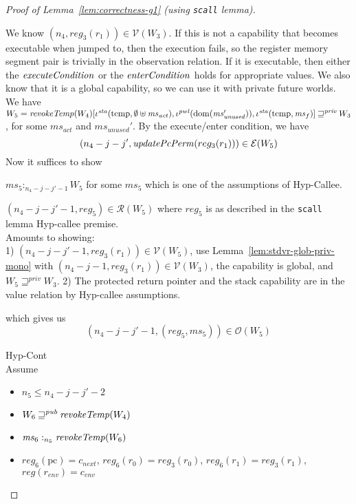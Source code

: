 \documentclass[a4paper]{article}
\DeclareMathOperator{\dom}{dom}
\newcommand\lau[1]{{\color{purple} \sf \footnotesize {LS: #1}}\\}
\renewcommand\lau[1]{}
\newcommand{\var}[1]{\mathit{#1}}
\newcommand{\hs}{\var{ms}}
\newcommand{\ms}{\hs}
\newcommand{\pcreg}{\mathrm{pc}}
\newcommand{\reg}{\var{reg}}
\newcommand{\heap}{\var{mem}}
\newcommand{\pwl}{\var{pwl}}
\newcommand{\sta}{\var{sta}}
\newcommand{\env}{\var{env}}
\newcommand{\unused}{\var{unused}}
\newcommand{\act}{\var{act}}
\newcommand{\plainfun}[2]{
  \ifthenelse{\equal{#2}{}}
  {\mathit{#1}}
  {\mathit{#1}(#2)}
}
\newcommand{\updatePcPerm}[1]{\plainfun{updatePcPerm}{#1}}
\newcommand{\execCond}[1]{\plainfun{executeCondition}{#1}}
\newcommand{\entryCond}[1]{\plainfun{enterCondition}{#1}}
\newcommand{\revokeTemp}[1]{\plainfun{revokeTemp}{#1}}
\newcommand{\futurewk}{\mathbin{\sqsupseteq}^{\var{pub}}}
\newcommand{\futurestr}{\mathbin{\sqsupseteq}^{\var{priv}}}
\newcommand{\heapSat}[3][\heap]{#1 :_{#2} #3}
\newcommand{\memSat}[3][n]{\heapSat[#2]{#1}{#3}}
\newcommand{\asmType}{\plaindom{AsmType}}
\newcommand{\plaindom}[1]{\mathrm{#1}}
\newcommand{\intr}[2]{\mathcal{#1}}
\newcommand{\valueintr}[1]{\intr{V}{#1}}
\newcommand{\exprintr}[1]{\intr{E}{#1}}
\newcommand{\regintr}[1]{\intr{R}{#1}}
\newcommand{\stdvr}{\valueintr{\asmType}}
\newcommand{\stder}{\exprintr{\asmType}}
\newcommand{\stdrr}{\regintr{\asmType}}
\newcommand{\observations}{\mathcal{O}}
\newcommand{\npair}[2][n]{\left(#1,#2 \right)}
\newcommand{\plainview}[1]{\mathrm{#1}}
\newcommand{\temp}{\plainview{temp}}
\begin{document}
\begin{proof}[Proof of Lemma~\ref{lem:correctness-g1} (using \texttt{scall} lemma)]
\begin{enumproof}[resume]
\begin{enumproof}
\begin{enumproof}
\begin{enumproof}
\begin{enumproof}
                      We know $\npair[n_4]{\reg_3(r_1)} \in \stdvr(W_3)$. If this is not a capability that becomes executable when jumped to, then the execution fails, so the register memory segment pair is trivially in the observation relation. If it is executable, then either the $\execCond{}$ or the $\entryCond{}$ holds for appropriate values. We also know that it is a global capability, so we can use it with private future worlds. We have $W_5 = \revokeTemp{W_4}[\iota^\sta (\temp,\emptyset \uplus \ms_\act),\iota^\pwl(\dom(\ms_\unused')),\iota^\sta(\temp,\ms_f)] \futurestr W_3$, for some $\ms_\act$ and $\ms_\unused'$. By the execute/enter condition, we have
                      \[
                        \npair[n_4-j-j']{\updatePcPerm{reg_3(r_1)}} \in \stder(W_5)
                      \]
                      Now it suffices to show
                      \begin{enumproof}
                        \item $\memSat[n_4-j-j'-1]{\ms_5}{W_5}$ for some $\ms_5$ which is one of the assumptions of Hyp-Callee.
                        \item $\npair[n_4-j-j'-1]{\reg_5} \in \stdrr(W_5)$ where $\reg_5$ is as described in the \texttt{scall} lemma Hyp-callee premise.\\
                          Amounts to showing:\lau{too deeply nested for environments}\\
                          1) $\npair[n_4-j-j'-1]{\reg_3(r_1)} \in \stdvr(W_5)$, use Lemma~\ref{lem:stdvr-glob-priv-mono} with $\npair[n_4-j-1]{\reg_3(r_1)} \in \stdvr(W_3)$, the capability is global, and $W_5 \futurestr W_3$.
                          2) The protected return pointer and the stack capability are in the value relation by Hyp-callee assumptions.
                      \end{enumproof}
                      which gives us
                      \[
                        \npair[n_4-j-j'-1]{(\reg_5,\ms_5)} \in \observations(W_5)
                      \]
                    \item Hyp-Cont\\
                      Assume
                      \begin{itemize}
                      \item $n_5 \leq n_4-j-j'-2$
                      \item $W_6 \futurewk \revokeTemp{W_4}$
                      \item $\memSat[n_5]{\ms_6}{\revokeTemp{W_6}}$
                      \item $\reg_6(\pcreg) = c_{\var{next}}$, $\reg_6(r_0) = \reg_3(r_0)$, $\reg_6(r_1) = \reg_3(r_1)$, $\reg(r_\env) = c_\env$

\end{itemize}
\end{enumproof}
\end{enumproof}
\end{enumproof}
\end{enumproof}
\end{enumproof}
\end{proof}
\end{document}
